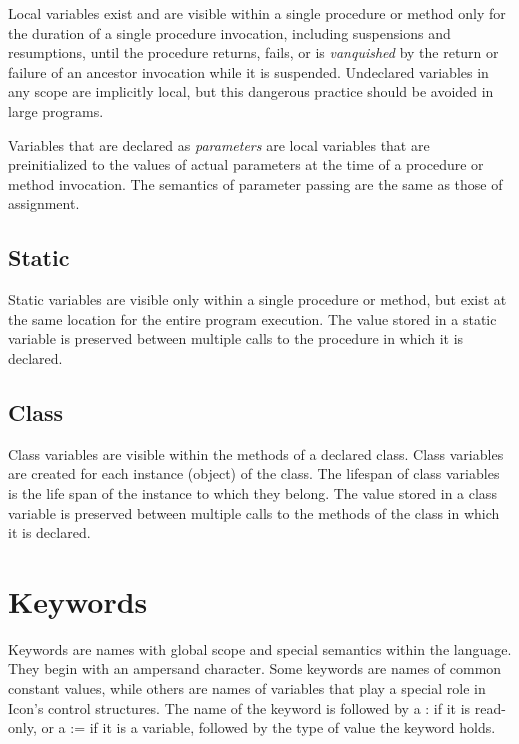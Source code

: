 Local variables exist and are visible within a single procedure or method only
for the duration of a single procedure invocation, including suspensions and
resumptions, until the procedure returns, fails, or is \textit{vanquished} by
the return or failure of an ancestor invocation while it is suspended.
Undeclared variables in any scope are implicitly local, but this
dangerous practice should be avoided in large programs.

Variables that are declared as \textit{parameters} are local variables
that are preinitialized to the values of actual parameters at the time
of a procedure or method invocation. The semantics of parameter passing
are the same as those of assignment.

\subsection*{Static}

Static variables are visible only within a single procedure or method, but exist
at the same location for the entire program execution. The value stored in a
static variable is preserved between multiple calls to the procedure in which it
is declared.

\subsection*{Class}

Class variables are visible within the methods of a declared class.  Class
variables are created for each instance (object) of the
class. The lifespan of class variables is the life span of the instance to which
they belong. The value stored in a class variable is preserved between multiple
calls to the methods of the class in which it is declared.

\section{Keywords}

Keywords are names with global scope and special semantics within
the language. They begin with an ampersand character. Some keywords are names of
common constant values, while others are names of variables that play a special
role in Icon's control structures. The
name of the keyword is followed by a : if it is read-only, or a := if it is a
variable, followed by the type of value the keyword holds.

